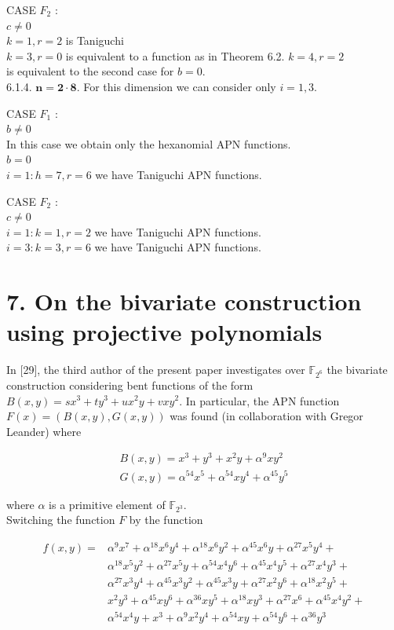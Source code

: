\documentclass[10pt]{article}
\begin{document}
CASE $F_{2}$ :\\
$c \neq 0$\\
$k=1, r=2$ is Taniguchi\\
$k=3, r=0$ is equivalent to a function as in Theorem 6.2. $k=4, r=2$\\
is equivalent to the second case for $b=0$.\\
6.1.4. $\mathbf{n}=\mathbf{2} \cdot \mathbf{8}$. For this dimension we can consider only $i=1,3$.

CASE $F_{1}$ :\\
$b \neq 0$\\
In this case we obtain only the hexanomial APN functions.\\
$b=0$\\
$i=1: h=7, r=6$ we have Taniguchi APN functions.

CASE $F_{2}$ :\\
$c \neq 0$\\
$i=1: k=1, r=2$ we have Taniguchi APN functions.\\
$i=3: k=3, r=6$ we have Taniguchi APN functions.

\section*{7. On the bivariate construction using projective polynomials}
In [29], the third author of the present paper investigates over $\mathbb{F}_{2^{6}}$ the bivariate construction considering bent functions of the form $B(x, y)=s x^{3}+ t y^{3}+u x^{2} y+v x y^{2}$. In particular, the APN function $F(x)=(B(x, y), G(x, y))$ was found (in collaboration with Gregor Leander) where

$$
\begin{gathered}
B(x, y)=x^{3}+y^{3}+x^{2} y+\alpha^{9} x y^{2} \\
G(x, y)=\alpha^{54} x^{5}+\alpha^{54} x y^{4}+\alpha^{45} y^{5}
\end{gathered}
$$

where $\alpha$ is a primitive element of $\mathbb{F}_{2^{3}}$.\\
Switching the function $F$ by the function

$$
\begin{aligned}
f(x, y)= & \alpha^{9} x^{7}+\alpha^{18} x^{6} y^{4}+\alpha^{18} x^{6} y^{2}+\alpha^{45} x^{6} y+\alpha^{27} x^{5} y^{4}+ \\
& \alpha^{18} x^{5} y^{2}+\alpha^{27} x^{5} y+\alpha^{54} x^{4} y^{6}+\alpha^{45} x^{4} y^{5}+\alpha^{27} x^{4} y^{3}+ \\
& \alpha^{27} x^{3} y^{4}+\alpha^{45} x^{3} y^{2}+\alpha^{45} x^{3} y+\alpha^{27} x^{2} y^{6}+\alpha^{18} x^{2} y^{5}+ \\
& x^{2} y^{3}+\alpha^{45} x y^{6}+\alpha^{36} x y^{5}+\alpha^{18} x y^{3}+\alpha^{27} x^{6}+\alpha^{45} x^{4} y^{2}+ \\
& \alpha^{54} x^{4} y+x^{3}+\alpha^{9} x^{2} y^{4}+\alpha^{54} x y+\alpha^{54} y^{6}+\alpha^{36} y^{3}
\end{aligned}
$$
\end{document}
